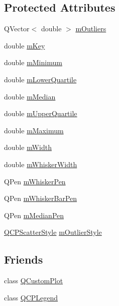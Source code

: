 \subsection*{Protected Attributes}
\begin{DoxyCompactItemize}
\item 
Q\+Vector$<$ double $>$ \hyperlink{class_q_c_p_statistical_box_a415e2f77a89396c2af999afe027bdf6c}{m\+Outliers}
\item 
double \hyperlink{class_q_c_p_statistical_box_a86fd1d3be5c5bc11d11eda7517069af4}{m\+Key}
\item 
double \hyperlink{class_q_c_p_statistical_box_a7143ece4e7e5f9ac010739fbc390bf0c}{m\+Minimum}
\item 
double \hyperlink{class_q_c_p_statistical_box_acac86cac93d9fa3d820b5aaa04ed96f6}{m\+Lower\+Quartile}
\item 
double \hyperlink{class_q_c_p_statistical_box_ae43287ca13c8166bde2ac19bf0969d23}{m\+Median}
\item 
double \hyperlink{class_q_c_p_statistical_box_a865afbcca332ee851aa45807381bc80e}{m\+Upper\+Quartile}
\item 
double \hyperlink{class_q_c_p_statistical_box_a16266f1e0e4e8e95b5d141c49479ef2e}{m\+Maximum}
\item 
double \hyperlink{class_q_c_p_statistical_box_af365e40b0f706c3d76f857c7957f629d}{m\+Width}
\item 
double \hyperlink{class_q_c_p_statistical_box_a4d166474f845d5db626e8b11a0815a6f}{m\+Whisker\+Width}
\item 
Q\+Pen \hyperlink{class_q_c_p_statistical_box_a25b7552499f0f090fcff02858b2265a5}{m\+Whisker\+Pen}
\item 
Q\+Pen \hyperlink{class_q_c_p_statistical_box_aa719b1d722a9f82364df1497a6dc1da8}{m\+Whisker\+Bar\+Pen}
\item 
Q\+Pen \hyperlink{class_q_c_p_statistical_box_a1af5b601049c575f778ae270f40c9443}{m\+Median\+Pen}
\item 
\hyperlink{class_q_c_p_scatter_style}{Q\+C\+P\+Scatter\+Style} \hyperlink{class_q_c_p_statistical_box_ae102e4187e1e6ba1f2df0f622b5171a4}{m\+Outlier\+Style}
\end{DoxyCompactItemize}
\subsection*{Friends}
\begin{DoxyCompactItemize}
\item 
class \hyperlink{class_q_c_p_statistical_box_a1cdf9df76adcfae45261690aa0ca2198}{Q\+Custom\+Plot}
\item 
class \hyperlink{class_q_c_p_statistical_box_a8429035e7adfbd7f05805a6530ad5e3b}{Q\+C\+P\+Legend}
\end{DoxyCompactItemize}
